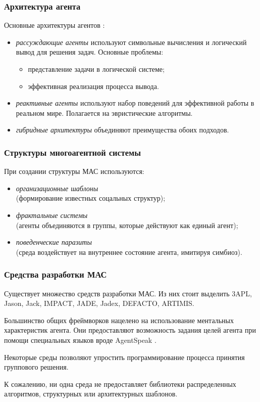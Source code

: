 \documentclass{beamer}
\begin{document}
\begin{frame}
  \frametitle{Архитектура агента}
  Основные архитектуры агентов \cite{Wooldridge1995}:
  \begin{itemize}
    \item {\it рассуждающие агенты} используют символьные вычисления
      и логический вывод для решения задач. Основные проблемы:
      \begin{itemize}
        \item представление задачи в логической системе;
        \item эффективная реализация процесса вывода.
      \end{itemize}
    \item {\it реактивные агенты} используют набор поведений для
      эффективной работы в реальном мире. Полагается на эвристические
      алгоритмы.
    \item {\it гибридные архитектуры} объединяют преимущества обоих подходов.
  \end{itemize}
\end{frame}

\begin{frame}
  \frametitle{Структуры многоагентной системы}
  При создании структуры МАС используются:
  \begin{itemize}
    \item {\it организационные шаблоны} \cite{Hayden1999} \\
      (формирование известных соцальных структур);
    \item {\it фрактальные системы} \cite{Fischer2003} \\
      (агенты объединяются в группы, которые действуют как единый агент);
    \item {\it поведенческие паразиты} \cite{Shabtay2007} \\
      (среда воздействует на внутреннее состояние агента, имитируя симбиоз).
  \end{itemize}
\end{frame}

\begin{frame}
  \frametitle{Средства разработки МАС}
  Существует множество средств разработки МАС. Из них стоит выделить
  3APL, Jason, Jack, IMPACT, JADE, Jadex, DEFACTO, ARTIMIS.

  Большинство общих фреймворков нацелено на использование ментальных
  характеристик агента. Они предоставляют возможность задания целей
  агента при помощи специальных языков вроде AgentSpeak \cite{Rao1996}.

  Некоторые среды позволяют упростить программирование процесса принятия
  группового решения.

  К сожалению, ни одна среда не предоставляет библиотеки
  распределенных алгоритмов, структурных или архитектурных шаблонов.
\end{frame}
\end{document}
